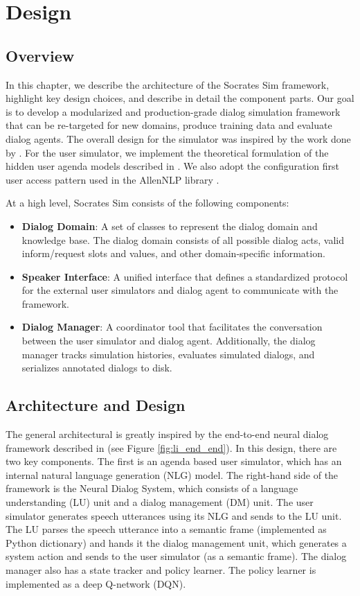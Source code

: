 \chapter{Design}
\label{chap:design}

\section{Overview}
\label{sec:designintroduction}

In this chapter, we describe the architecture of the Socrates Sim framework, highlight key design choices, and describe in detail the component parts. Our goal is to develop a modularized and production-grade dialog simulation framework that can be re-targeted for new domains, produce training data and evaluate dialog agents. The overall design for the simulator was inspired by the work done by \cite{li_usersim}. For the user simulator, we implement the theoretical formulation of the hidden user agenda models described in \cite{Schatzmann2009TheHA}. We also adopt the configuration first user access pattern used in the AllenNLP library \cite{Gardner_allennlp}.

At a high level, Socrates Sim consists of the following components:
\begin{itemize}
	\item \textbf{Dialog Domain}: A set of classes to represent the dialog domain and knowledge base. The dialog domain consists of all possible dialog acts, valid inform/request slots and values, and other domain-specific information. 
	\item \textbf{Speaker Interface}: A unified interface that defines a standardized protocol for the external user simulators and dialog agent to communicate with the framework. 
	\item \textbf{Dialog Manager}: A coordinator tool that facilitates the conversation between the user simulator and dialog agent. Additionally, the dialog manager tracks simulation histories, evaluates simulated dialogs, and serializes annotated dialogs to disk.  
\end{itemize}


\section{Architecture and Design} 

The general architectural is greatly inspired by the end-to-end neural dialog framework described in \cite{li_end_to_end}  (see Figure \ref{fig:li_end_end}). In this design, there are two key components. The first is an agenda based user simulator, which has an internal natural language generation (NLG) model. The right-hand side of the framework is the Neural Dialog System, which consists of a language understanding (LU) unit and a dialog management (DM) unit. The user simulator generates speech utterances using its NLG and sends to the LU unit. The LU parses the speech utterance into a semantic frame (implemented as Python dictionary) and hands it the dialog management unit, which generates a system action and sends to the user simulator (as a semantic frame). The dialog manager also has a state tracker and policy learner. The policy learner is implemented as a deep Q-network (DQN). 

